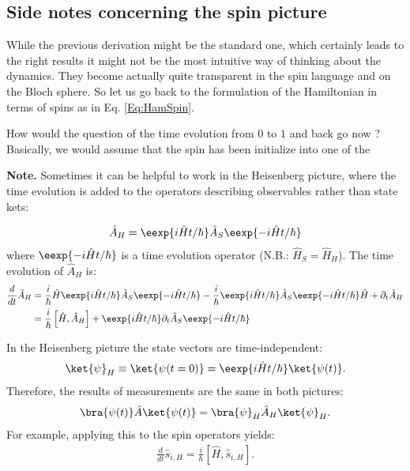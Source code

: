 \subsection{Side notes concerning the spin picture}

While the previous derivation might be the standard one, which certainly leads to the right results it might not be the most intuitive way of thinking about the dynamics. They become actually quite transparent in the spin language and on the Bloch sphere. So let us go back to the formulation of the Hamiltonian in terms of spins as in Eq. \eqref{Eq:HamSpin}.

How would the question of the time evolution from $0$ to $1$ and back go now ? Basically, we would assume that the spin has been initialize into one of the 

\textbf{Note.} Sometimes it can be helpful to work in the Heisenberg picture, where the time evolution is added to the operators describing observables rather than state kets:

\begin{align}
	\hat{A}_H=\eexp{i{\hat{H} t}/{\hbar}} \hat{A}_S \eexp{-i{\hat{H} t}/{\hbar}}
\end{align}
where $\eexp{-i{\hat{H} t}/{\hbar}}$ is a time evolution operator (N.B.: $\hat{H}_S = \hat{H}_H$). The time evolution of $\hat{A}_H$ is:
\begin{align}
 \notag \frac{d}{dt} \hat{A}_H &= \frac{i}{\hbar}\hat{H}\eexp{i{\hat{H}t}/{\hbar}}\hat{A}_S \eexp{-i{\hat{H} t}/{\hbar}}-\frac{i}{\hbar} \eexp{i{\hat{H} t}/{\hbar}}\hat{A}_S \eexp{-i{\hat{H}t}/{\hbar}}\hat{H}+\partial_t\hat{A}_H\\
&= \frac{i}{\hbar}\left[\hat{H},\hat{A}_H\right] + \eexp{i{\hat{H}t}/{\hbar}}\partial_t\hat{A}_S\eexp{-i{\hat{H}t}/{\hbar}}
 \end{align}

In the Heisenberg picture the state vectors are time-in\-de\-pen\-dent:
\begin{align}
	\ket{\psi}_H \equiv \ket{\psi(t=0)}=\eexp{i{\hat{H}}t/{\hbar}} \ket{\psi(t)}.
\end{align}
Therefore, the results of measurements are the same in both pictures:
\begin{align}
\bra{\psi(t)}\hat{A}\ket{\psi(t)} = \bra{\psi}_H \hat{A}_H \ket{\psi}_H.
\end{align}
For example, applying this to the spin operators yields:
\begin{align}						\frac{d}{dt}\hat{s}_{i,H}=\frac{i}{\hbar}\left[\hat{H},\hat{s}_{i,H}\right].
\end{align}